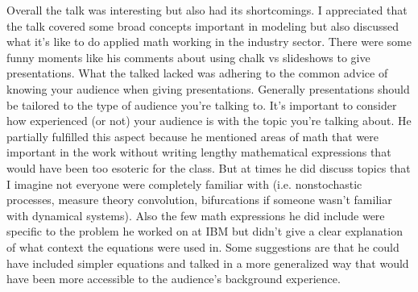 \documentclass[11pt]{article}
\begin{document}
\noindent Overall the talk was interesting but also had its shortcomings.  I appreciated that the talk covered some broad concepts important in modeling but also discussed what it's like to do applied math working in the industry sector.  There were some funny moments like his comments about using chalk vs slideshows to give presentations. What the talked lacked was adhering to the common advice of knowing your audience when giving presentations.  Generally presentations should be tailored to the type of audience you're talking to.  It's important to consider how experienced (or not) your audience is with the topic you're talking about. He partially fulfilled this aspect because he mentioned areas of math that were important in the work without writing lengthy mathematical expressions that would have been too esoteric for the class. But at times he did discuss topics that I imagine not everyone were completely familiar with (i.e. nonstochastic processes, measure theory convolution, bifurcations if someone wasn't familiar with dynamical systems).  Also the few math expressions he did include were specific to the problem he worked on at IBM but didn't give a clear explanation of what context the equations were used in.  Some suggestions are that he could have included simpler equations and talked in a more generalized way that would have been more accessible to the audience's background experience.
\end{document}

